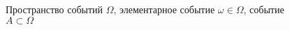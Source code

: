 \begin{figure}
\centering



\caption{Пространство событий $\Omega$, элементарное событие $\omega
  \in \Omega$,
событие $A \subset \Omega$}
\label{figAddProbabilityDefinition}
\end{figure}
